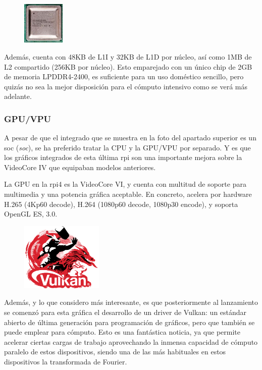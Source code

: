 \begin{figure}
  \centering
  \includegraphics[width=0.18\textwidth]{img/rpi_parts/rpi_cpu.jpg}
  \label{fig:rpi_cpu}
\end{figure}
Además, cuenta con 48KB de L1I y 32KB de L1D por núcleo, así como 1MB de L2 compartido (256KB por núcleo). Esto emparejado con un único chip de 2GB de memoria LPDDR4-2400, es suficiente para un uso doméstico sencillo, pero quizás no sea la mejor disposición para el cómputo intensivo como se verá más adelante.

\subsubsection{GPU/VPU}
A pesar de que el integrado que se muestra en la foto del apartado superior es un \acrshort{soc} (\textit{\acrlong{soc}}), se ha preferido tratar la CPU y la GPU/VPU por separado. Y es que los gráficos integrados de esta última \acrlong{rpi} son una importante mejora sobre la VideoCore IV que equipaban modelos anteriores.

La GPU en la \acrshort{rpi}4 es la VideoCore VI, y cuenta con multitud de soporte para multimedia y una potencia gráfica aceptable. En concreto, acelera por hardware H.265 (4Kp60 decode), H.264 (1080p60 decode, 1080p30 encode), y soporta OpenGL ES, 3.0.

\begin{figure}
  \centering
  \includegraphics[width=0.35\textwidth]{img/vulkan_logo.png}
  \label{fig:vulkan_logo}
\end{figure}
Además, y lo que considero más interesante, es que posteriormente al lanzamiento se comenzó para esta gráfica el desarrollo de un driver de Vulkan: un estándar abierto de última generación para programación de gráficos, pero que también se puede emplear para cómputo. Esto es una fantástica noticia, ya que permite acelerar ciertas cargas de trabajo aprovechando la inmensa capacidad de cómputo paralelo de estos dispositivos, siendo una de las más habituales en estos dispositivos la transformada de Fourier.


